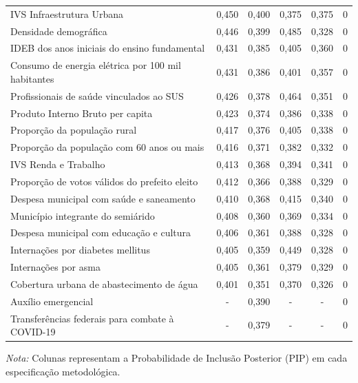\begin{table}[htbp]
\begin{tabular}{lccccr}
IVS Infraestrutura Urbana & 0,450 & 0,400 & 0,375 & 0,375 & 0 \\
Densidade demográfica & 0,446 & 0,399 & 0,485 & 0,328 & 0 \\
IDEB dos anos iniciais do ensino fundamental & 0,431 & 0,385 & 0,405 & 0,360 & 0 \\
Consumo de energia elétrica por 100 mil habitantes & 0,431 & 0,386 & 0,401 & 0,357 & 0 \\
Profissionais de saúde vinculados ao SUS & 0,426 & 0,378 & 0,464 & 0,351 & 0 \\
Produto Interno Bruto per capita & 0,423 & 0,374 & 0,386 & 0,338 & 0 \\
Proporção da população rural & 0,417 & 0,376 & 0,405 & 0,338 & 0 \\
Proporção da população com 60 anos ou mais & 0,416 & 0,371 & 0,382 & 0,332 & 0 \\
IVS Renda e Trabalho & 0,413 & 0,368 & 0,394 & 0,341 & 0 \\
Proporção de votos válidos do prefeito eleito & 0,412 & 0,366 & 0,388 & 0,329 & 0 \\
Despesa municipal com saúde e saneamento & 0,410 & 0,368 & 0,415 & 0,340 & 0 \\
Município integrante do semiárido & 0,408 & 0,360 & 0,369 & 0,334 & 0 \\
Despesa municipal com educação e cultura & 0,406 & 0,361 & 0,388 & 0,328 & 0 \\
Internações por diabetes mellitus & 0,405 & 0,359 & 0,449 & 0,328 & 0 \\
Internações por asma & 0,405 & 0,361 & 0,379 & 0,329 & 0 \\
Cobertura urbana de abastecimento de água & 0,401 & 0,351 & 0,370 & 0,326 & 0 \\
Auxílio emergencial & - & 0,390 & - & - & 0 \\
Transferências federais para combate à COVID-19 & - & 0,379 & - & - & 0 \\
\bottomrule
\end{tabular}
\begin{tablenotes}\footnotesize
\item \textit{Nota:} Colunas representam a Probabilidade de Inclusão Posterior (PIP) em cada especificação metodológica.
\end{tablenotes}
\end{table}